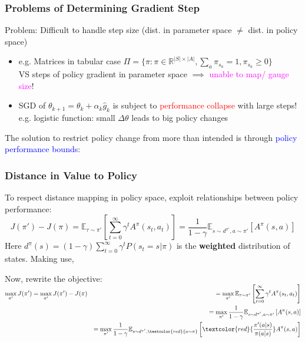 \documentclass{article}
\begin{document}
    \begin{defbox}
        \subsubsection*{Problems of Determining Gradient Step}
        Problem: Difficult to handle step size (dist. in parameter space $\neq$ dist. in policy space)
        \begin{itemize}
        \item e.g. Matrices in tabular case $\Pi = \{ \pi: \pi \in \mathbb{R}^{|S| \times |A|}, \sum_{a} \pi_{s_a} = 1, \pi_{s_a} \geq 0 \}$
            \\VS steps of policy gradient in parameter space $\implies$ \textcolor{magenta}{unable to map/ gauge size}!
        \item SGD of $\theta_{k+1} = \theta_{k} + \alpha_{k} \hat{g}_k$ is subject to \textcolor{red}{performance collapse} with large steps!
            \\e.g. logistic function: small $\Delta \theta$ leads to big policy changes
        \end{itemize}
    \end{defbox}

    The solution to restrict policy change from more than intended is through \textcolor{blue}{policy performance bounds}:
    \begin{defbox}
        \subsubsection*{Distance in Value to Policy}
        To respect distance mapping in policy space, exploit relationships between policy performance:
        \begin{equation*}
            J(\pi') - J(\pi) = \mathbb{E}_{\tau \sim \pi'} \left[ \sum_{t = 0}^{\infty} \gamma^{t} A^{\pi}(s_t, a_t) \right]
            = \frac{1}{1-\gamma} \mathbb{E}_{s \sim d^{\pi'}, a \sim \pi'} \left[ A^{\pi} (s, a) \right]
        \end{equation*}
        Here $d^{\pi}(s) = (1 - \gamma) \sum_{t = 0}^{\infty} \gamma^{t} P(s_t = s | \pi)$ is the \textbf{weighted} distribution of states. Making use,

        Now, rewrite the objective:
        $\begin{aligned}
            \mathop{\max}\limits_{\pi'} J(\pi') & = \mathop{\max}\limits_{\pi'} J(\pi') - J(\pi) & = \mathop{\max}\limits_{\pi'} \mathbb{E}_{\tau \sim \pi'} \left[ \sum_{t = 0}^{\infty} \gamma^{t} A^{\pi}(s_t, a_t) \right] \\
            & & = \mathop{\max}\limits_{\pi'} \frac{1}{1-\gamma} \mathbb{E}_{s \sim d^{\pi'}, a \sim \pi'} \left[ A^{\pi} (s, a) \right] \\ 
            & & = \mathop{\max}\limits_{\pi'} \frac{1}{1-\gamma} \mathbb{E}_{s \sim d^{\pi'}, \textcolor{red}{a \sim \pi}} \left[ \textcolor{red}{\frac{\pi' (a | s)}{\pi(a | s)}} A^{\pi} (s, a) \right]
        \end{aligned}$
    \end{defbox}
\end{document}
